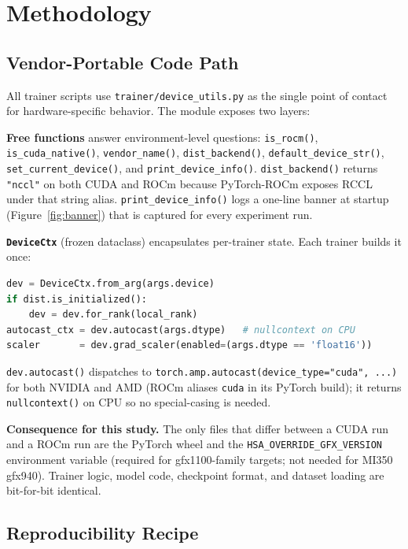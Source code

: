 \section{Methodology}
\label{sec:methodology}

\subsection{Vendor-Portable Code Path}
\label{sec:methodology:portability}

All trainer scripts use \texttt{trainer/device\_utils.py} as the single point of
contact for hardware-specific behavior.  The module exposes two layers:

\textbf{Free functions} answer environment-level questions:
\texttt{is\_rocm()}, \texttt{is\_cuda\_native()}, \texttt{vendor\_name()},
\texttt{dist\_backend()}, \texttt{default\_device\_str()},
\texttt{set\_current\_device()}, and \texttt{print\_device\_info()}.
\texttt{dist\_backend()} returns \texttt{"nccl"} on both CUDA and ROCm because
PyTorch-ROCm exposes RCCL under that string alias.
\texttt{print\_device\_info()} logs a one-line banner at startup
(Figure~\ref{fig:banner}) that is captured for every experiment run.

\textbf{\texttt{DeviceCtx}} (frozen dataclass) encapsulates per-trainer state.
Each trainer builds it once:
\begin{lstlisting}[language=Python,basicstyle=\small\ttfamily]
dev = DeviceCtx.from_arg(args.device)
if dist.is_initialized():
    dev = dev.for_rank(local_rank)
autocast_ctx = dev.autocast(args.dtype)   # nullcontext on CPU
scaler       = dev.grad_scaler(enabled=(args.dtype == 'float16'))
\end{lstlisting}
\texttt{dev.autocast()} dispatches to
\texttt{torch.amp.autocast(device\_type="cuda", ...)} for both NVIDIA and AMD
(ROCm aliases \texttt{cuda} in its PyTorch build); it returns
\texttt{nullcontext()} on CPU so no special-casing is needed.

\textbf{Consequence for this study.}  The only files that differ between a CUDA
run and a ROCm run are the PyTorch wheel and the \texttt{HSA\_OVERRIDE\_GFX\_VERSION}
environment variable (required for gfx1100-family targets; not needed for MI350
gfx940).  Trainer logic, model code, checkpoint format, and dataset loading are
bit-for-bit identical.

\subsection{Reproducibility Recipe}
\label{sec:methodology:repro}

